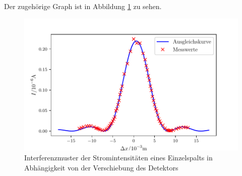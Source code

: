 Der zugehörige Graph ist in Abbildung \ref{fig:Einzel} zu sehen.
\begin{figure}[H]
	\centering
	\includegraphics[width=\linewidth-70pt,height=\textheight-70pt,keepaspectratio]{Einzelspalt.pdf}
	\caption{Interferenzmuster der Stromintensitäten eines Einzelspalts in Abhängigkeit von der Verschiebung des Detektors}
	\label{fig:Einzel}
	\end{figure}

